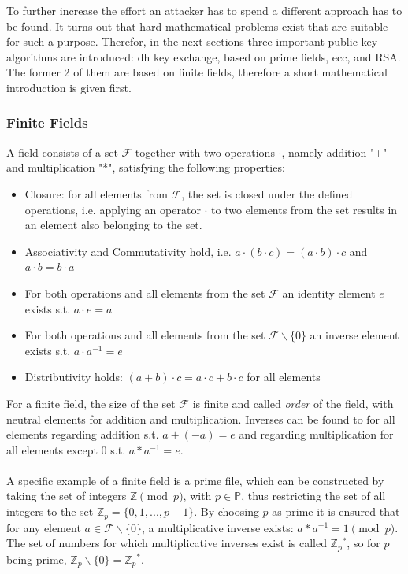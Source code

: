 To further increase the effort an attacker has to spend a different approach has to be found. It turns out that hard mathematical problems exist that are 
suitable for such a purpose. 
Therefor, in the next sections three important public key algorithms are introduced: \gls{dh} key exchange, based on prime fields, \gls{ecc}, and RSA.
The former 2 of them are based on finite fields, therefore a short mathematical introduction is given first.

\subsubsection{Finite Fields}\label{finiteFields}

A field consists of a set $\mathcal{F}$ together with two operations $\cdot$, namely addition "+" and multiplication "*", satisfying the following properties:

\begin{itemize}
 \item  Closure: for all elements from $\mathcal{F}$, the set is closed under the defined operations, i.e. applying an operator $\cdot$ to two elements from the set results in an
element also belonging to the set.
 \item Associativity and Commutativity hold, i.e. $a \cdot (b \cdot c) = (a \cdot b) \cdot c$ and $a \cdot b = b \cdot a$
 \item For both operations and all elements from the set $\mathcal{F}$ an identity element $e$ exists s.t. $a\cdot e = a$
 \item For both operations and all elements from the set $\mathcal{F} \backslash \{0\}$ an inverse element exists s.t. $a\cdot a^{-1} = e$
 \item Distributivity holds: $(a+b) \cdot c = a \cdot c + b \cdot c$ for all elements 
\end{itemize}

For a finite field, the size of the set 
$\mathcal{F}$ is finite and called \textit{order} of the field, with neutral elements for addition and
multiplication. Inverses can be found to for all
elements regarding addition s.t. $a + (-a) = e$ and regarding multiplication for all elements except ${0}$ s.t. $a * a^{-1} = e$.
\\
\\
A specific example of a finite field is a prime file, which can be constructed by taking the set of integers $\mathbb{Z}\pmod p$, with $p \in \mathbb{P}$, thus
restricting the set of all integers to the set $\mathbb{Z}_p = \{0, 1, ..., p-1\}$.
By choosing $p$ as prime it is ensured that for any element $a \in \mathcal{F} \backslash\{0\}$, a multiplicative inverse exists: $ a * a^{-1} = 1 \pmod p$.
The set of numbers for which multiplicative inverses exist is called $\mathbb{Z}{_p}^*$, so for $p$ being prime, $\mathbb{Z}_p \backslash \{0\} = \mathbb{Z}{_p}^*$.
\\

